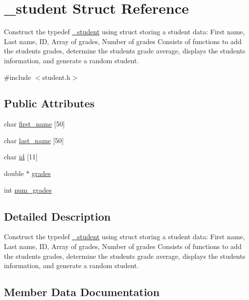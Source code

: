 \hypertarget{struct__student}{}\section{\+\_\+student Struct Reference}
\label{struct__student}


Construct the typedef \mbox{\hyperlink{struct__student}{\+\_\+student}} using struct storing a student data\+: First name, Last name, ID, Array of grades, Number of grades Consists of functions to add the student\textquotesingle{}s grades, determine the student\textquotesingle{}s grade average, displays the student\textquotesingle{}s information, and generate a random student.  




{\ttfamily \#include $<$student.\+h$>$}

\subsection*{Public Attributes}
\begin{DoxyCompactItemize}
\item 
char \mbox{\hyperlink{struct__student_a272ec3136434e8d3281a615cf31cc987}{first\+\_\+name}} \mbox{[}50\mbox{]}
\item 
char \mbox{\hyperlink{struct__student_a18eb2a90671a2292c017b8f4fbde7eec}{last\+\_\+name}} \mbox{[}50\mbox{]}
\item 
char \mbox{\hyperlink{struct__student_adaee78078859cdecdbe9128dd655b748}{id}} \mbox{[}11\mbox{]}
\item 
double $\ast$ \mbox{\hyperlink{struct__student_ad0f75a9ff0f6104eb9e3bb3c4f7ad97b}{grades}}
\item 
int \mbox{\hyperlink{struct__student_a6592ee968ed2226737f45243e7602636}{num\+\_\+grades}}
\end{DoxyCompactItemize}


\subsection{Detailed Description}
Construct the typedef \mbox{\hyperlink{struct__student}{\+\_\+student}} using struct storing a student data\+: First name, Last name, ID, Array of grades, Number of grades Consists of functions to add the student\textquotesingle{}s grades, determine the student\textquotesingle{}s grade average, displays the student\textquotesingle{}s information, and generate a random student. 

\subsection{Member Data Documentation}
\mbox{\label{struct__student_a272ec3136434e8d3281a615cf31cc987}} 
